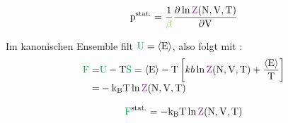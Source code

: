 \begin{defnbox}\nospacing
  \begin{defn}
    \begin{equation}
      \pzs=\frac{1}{\betac}\pfrac{\ln\Zzk}{\Vz}
    \end{equation}
  \end{defn}
\end{defnbox}
\begin{sectionbox}\nospacing
  Im kanonischen Ensemble filt $\Upot=\obs{\Ez}$, also folgt mit :
  \begin{align*}
    \Fpot=&\Upot-\Tz\Spot=\obs{\Ez}-\Tz \left[kb\ln\Zzk+\frac{\obs{\Ez}}{\Tz}\right]\nalign
            =&-\kb\Tz\ln\Zzk
  \end{align*}
\end{sectionbox}
\begin{defnbox}\nospacing
  \begin{defn}
    \begin{equation}
      \Fpot^{\text{stat.}}=-\kb\Tz\ln\Zzk
    \end{equation}
  \end{defn}
\end{defnbox}
